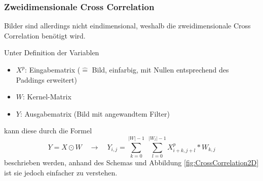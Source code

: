 \documentclass[12pt,a4]{article}
\begin{document}
\subsubsection{Zweidimensionale Cross Correlation}\label{sec:CrossCorrelation2D}
Bilder sind allerdings nicht eindimensional, weshalb die zweidimensionale Cross Correlation benötigt wird. 

Unter Definition der Variablen
\begin{itemize}
\item $X^p$: Eingabematrix ($\hat{=}$ Bild, einfarbig, mit Nullen entsprechend des Paddings erweitert)
\item $W$: Kernel-Matrix
\item $Y$: Ausgabematrix (Bild mit angewandtem Filter)
\end{itemize}
kann diese durch die Formel
\begin{equation}
Y = X \odot W \quad \rightarrow \quad Y_{i, j} = \sum\limits_{k=0}^{|W|-1} \; \sum\limits_{l=0}^{|W_l|-1} X^p_{i+k, j+l} * W_{k, j}
\end{equation}
beschrieben werden, anhand des Schemas und Abbildung \ref{fig:CrossCorrelation2D} ist sie jedoch einfacher zu verstehen.
\end{document}
